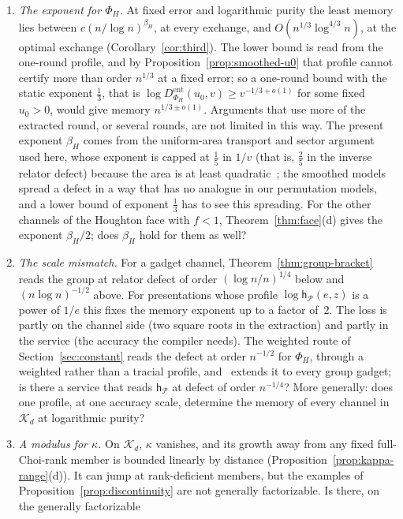\documentclass[11pt,a4paper]{article}
\theoremstyle{plain}
\theoremstyle{definition}
\theoremstyle{remark}
\begin{document}
\begin{enumerate}[label=(\arabic*)]
\item \emph{The exponent for $\Phi_H$.} At fixed error and logarithmic purity the least memory lies between $c(n/\log n)^{\beta_H}$, at every exchange, and
$O(n^{1/3}\log^{4/3}n)$, at the optimal exchange (Corollary~\ref{cor:third}). The lower bound is read from the one-round profile, and by
Proposition~\ref{prop:smoothed-u0} that profile cannot certify more than order $n^{1/3}$ at a fixed error; so a one-round bound with the static
exponent $\frac13$, that is $\log D^{\mathrm{ent}}_{\Phi_H}(u_0,v)\ge v^{-1/3+o(1)}$ for some fixed $u_0>0$, would give memory $n^{1/3\pm o(1)}$. Arguments that
use more of the extracted round, or several rounds, are not limited in this way. The present exponent $\beta_H$ comes from the uniform-area
transport and sector argument used here, whose exponent is capped at $\frac15$ in $1/v$ (that is, $\frac25$ in the inverse relator defect) because the area
is at least quadratic~\cite{DouglasMghirbiA}; the smoothed models spread a defect in a way that has no analogue in our permutation models, and a
lower bound of exponent $\frac13$ has to see this spreading. For the other channels of the Houghton face with $f<1$, Theorem~\ref{thm:face}(d)
gives the exponent $\beta_H/2$; does $\beta_H$ hold for them as well?
\item \emph{The scale mismatch.} For a gadget channel, Theorem~\ref{thm:group-bracket} reads the group at relator defect of order $(\log n/n)^{1/4}$ below and
$(n\log n)^{-1/2}$ above. For presentations whose profile $\log\mathsf h_{\mathcal P}(e,z)$ is a power of $1/e$ this fixes the memory exponent up to a
factor of~$2$. The loss is partly on the channel side (two square roots in the extraction) and partly in the service (the accuracy the compiler
needs). The weighted route of Section~\ref{sec:constant} reads the defect at order $n^{-1/2}$ for $\Phi_H$, through a weighted rather than a tracial
profile, and~\cite{DouglasMghirbiC} extends it to every group gadget; is there a service that reads $\mathsf h_{\mathcal P}$ at defect of order
$n^{-1/4}$? More
generally: does one profile, at one accuracy scale, determine the memory of every channel in $\mathcal K_d$ at logarithmic purity?
\item \emph{A modulus for $\kappa$.} On $\mathcal K_d$, $\kappa$ vanishes, and its growth away from any fixed full-Choi-rank member is bounded linearly by distance
(Proposition~\ref{prop:kappa-range}(d)). It can jump at rank-deficient members, but the examples of Proposition~\ref{prop:discontinuity} are not generally factorizable. Is there, on the generally factorizable

\end{enumerate}
\end{document}
